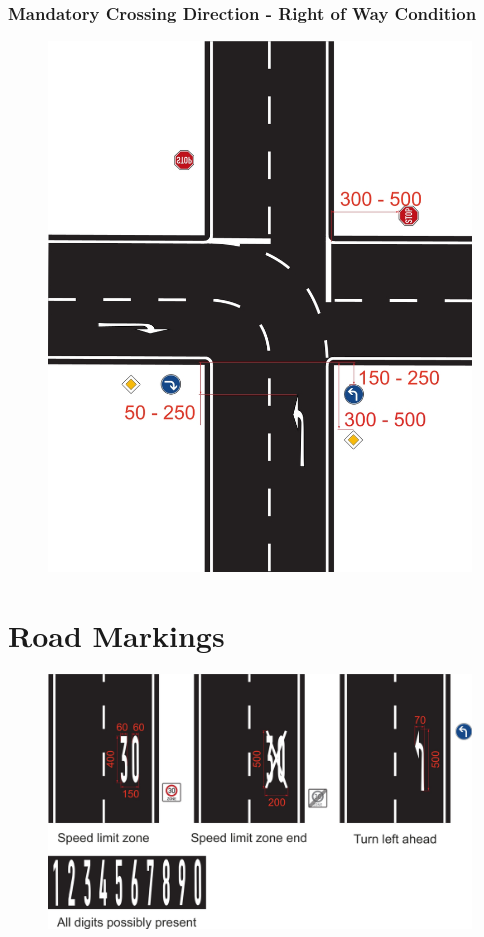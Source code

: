 \subsubsection{Mandatory Crossing Direction - Right of Way Condition}
\begin{figure}[H]
	\begin{center}
		\centering\includegraphics[]{graphics/Abb_16_mandatory_right_of_way.jpg}
	\end{center}
\end{figure}

\section{Road Markings}
\label{fig_road_markings}
\begin{figure}[H]
	\begin{center}
		\centering\includegraphics[width=\textwidth]{graphics/Abb_17_road_markings.jpg}
	\end{center}
\end{figure}

